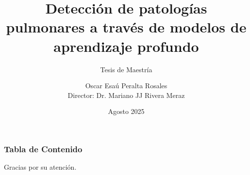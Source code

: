 \documentclass{beamer}
\title[Detección de patologías pulmonares]{Detección de patologías pulmonares a través de modelos de aprendizaje profundo}
\subtitle{Tesis de Maestría}
\author[Oscar Esaú Peralta Rosales]{Oscar Esaú Peralta Rosales\\Director: Dr. Mariano JJ Rivera Meraz}
\institute[CIMAT]{Centro de Investigación en Matemáticas A.C.}
\date{Agosto 2025}
\begin{document}
\frame{\titlepage}

\begin{frame}
\frametitle{Tabla de Contenido}
\tableofcontents
\end{frame}




















% 

\begin{frame}
\begin{center}
    Gracias por su atención.
\end{center}
\end{frame}
\end{document}
